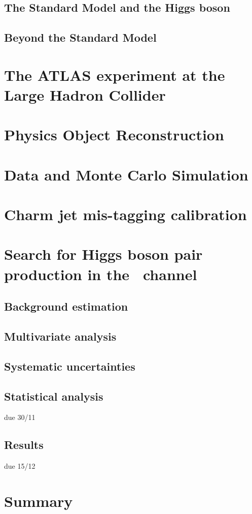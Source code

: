 \documentclass[twoside,11pt]{report}
\begin{document}
\section{The Standard Model and the Higgs boson}
\section{Beyond the Standard Model}
\large
\chapter{The ATLAS experiment at the Large Hadron Collider}


\chapter{Physics Object Reconstruction}



 
\chapter{Data and Monte Carlo Simulation}

\chapter{Charm jet mis-tagging calibration}





\large
\chapter{Search for Higgs boson pair production in the \bbtt\ channel}
\label{sec:search for dihiggs}



\section{Background estimation}
\label{sec:DiHiggs:backgroundEstimation}

\section{Multivariate analysis}
\section{Systematic uncertainties}
\label{sec:DiHiggs:systematics}
\section{Statistical analysis}
\label{sec:DiHiggs:analysis}
due 30/11
\section{Results}
\label{sec:DiHiggs:results}
due 15/12

\chapter{Summary}

\printbibliography
\appendix

\end{document}
